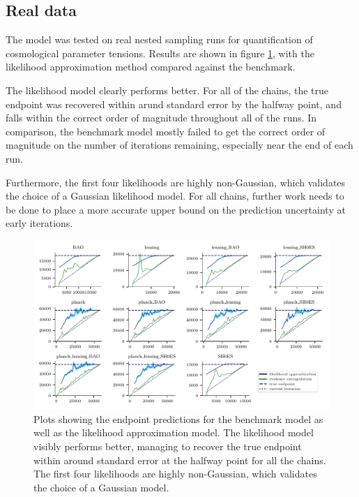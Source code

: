 \documentclass[usenatbib]{mnras}
\begin{document}
\subsection{Real data}
The model was tested on real nested sampling runs for quantification of cosmological parameter tensions. Results are shown in figure \ref{fig:lcdm_predictions}, with the likelihood approximation method compared against the benchmark.
\par
The likelihood model clearly performs better. For all of the chains, the true endpoint was recovered within arund standard error by the halfway point, and falls within the correct order of magnitude throughout all of the runs. In comparison, the benchmark model mostly failed to get the correct order of magnitude on the number of iterations remaining, especially near the end of each run.
\par
Furthermore, the first four likelihoods are highly non-Gaussian, which validates the choice of a Gaussian likelihood model. For all chains, further work needs to be done to place a more accurate upper bound on the prediction uncertainty at early iterations. 
\begin{figure}
\begin{center}
	\includegraphics{Figures/lcdm_predictions.pdf}
\end{center}
\caption{Plots showing the endpoint predictions for the benchmark model as well as the likelihood approximation model. The likelihood model visibly performs better, managing to recover the true endpoint within around standard error at the halfway point for all the chains. The first four likelihoods are highly non-Gaussian, which validates the choice of a Gaussian model.}
\label{fig:lcdm_predictions}
\end{figure}
\end{document}
